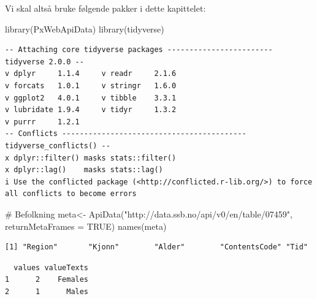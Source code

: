 \documentclass[
  norsk,
  letterpaper,
  DIV=11,
  numbers=noendperiod]{scrreprt}
\newenvironment{Shaded}{\begin{snugshade}}{\end{snugshade}}
\newcommand{\AttributeTok}[1]{\textcolor[rgb]{0.40,0.45,0.13}{#1}}
\newcommand{\CommentTok}[1]{\textcolor[rgb]{0.37,0.37,0.37}{#1}}
\newcommand{\ConstantTok}[1]{\textcolor[rgb]{0.56,0.35,0.01}{#1}}
\newcommand{\FunctionTok}[1]{\textcolor[rgb]{0.28,0.35,0.67}{#1}}
\newcommand{\NormalTok}[1]{\textcolor[rgb]{0.00,0.23,0.31}{#1}}
\newcommand{\OtherTok}[1]{\textcolor[rgb]{0.00,0.23,0.31}{#1}}
\newcommand{\SpecialCharTok}[1]{\textcolor[rgb]{0.37,0.37,0.37}{#1}}
\newcommand{\StringTok}[1]{\textcolor[rgb]{0.13,0.47,0.30}{#1}}
\theoremstyle{definition}
\theoremstyle{remark}
\begin{document}
Vi skal altså bruke følgende pakker i dette kapittelet:

\begin{Shaded}
\begin{Highlighting}[]
\FunctionTok{library}\NormalTok{(PxWebApiData)}
\FunctionTok{library}\NormalTok{(tidyverse)}
\end{Highlighting}
\end{Shaded}

\begin{verbatim}
-- Attaching core tidyverse packages ------------------------ tidyverse 2.0.0 --
v dplyr     1.1.4     v readr     2.1.6
v forcats   1.0.1     v stringr   1.6.0
v ggplot2   4.0.1     v tibble    3.3.1
v lubridate 1.9.4     v tidyr     1.3.2
v purrr     1.2.1     
-- Conflicts ------------------------------------------ tidyverse_conflicts() --
x dplyr::filter() masks stats::filter()
x dplyr::lag()    masks stats::lag()
i Use the conflicted package (<http://conflicted.r-lib.org/>) to force all conflicts to become errors
\end{verbatim}

\begin{Shaded}
\begin{Highlighting}[]
\CommentTok{\# Befolkning}
\NormalTok{meta}\OtherTok{\textless{}{-}} \FunctionTok{ApiData}\NormalTok{(}\StringTok{"http://data.ssb.no/api/v0/en/table/07459"}\NormalTok{,  }\AttributeTok{returnMetaFrames =} \ConstantTok{TRUE}\NormalTok{)}
\FunctionTok{names}\NormalTok{(meta)}
\end{Highlighting}
\end{Shaded}

\begin{verbatim}
[1] "Region"       "Kjonn"        "Alder"        "ContentsCode" "Tid"         
\end{verbatim}

\begin{Shaded}
\end{Shaded}

\begin{verbatim}
  values valueTexts
1      2    Females
2      1      Males
\end{verbatim}
\end{document}
